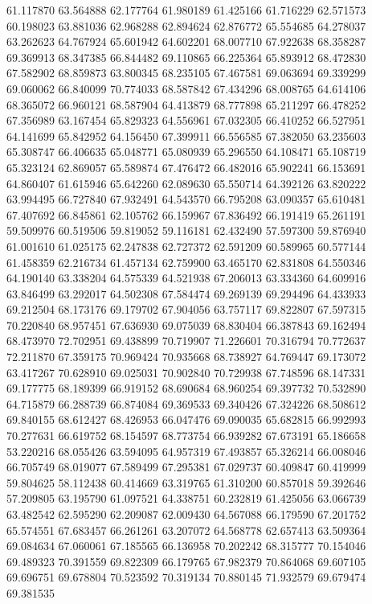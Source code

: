 61.117870
63.564888
62.177764
61.980189
61.425166
61.716229
62.571573
60.198023
63.881036
62.968288
62.894624
62.876772
65.554685
64.278037
63.262623
64.767924
65.601942
64.602201
68.007710
67.922638
68.358287
69.369913
68.347385
66.844482
69.110865
66.225364
65.893912
68.472830
67.582902
68.859873
63.800345
68.235105
67.467581
69.063694
69.339299
69.060062
66.840099
70.774033
68.587842
67.434296
68.008765
64.614106
68.365072
66.960121
68.587904
64.413879
68.777898
65.211297
66.478252
67.356989
63.167454
65.829323
64.556961
67.032305
66.410252
66.527951
64.141699
65.842952
64.156450
67.399911
66.556585
67.382050
63.235603
65.308747
66.406635
65.048771
65.080939
65.296550
64.108471
65.108719
65.323124
62.869057
65.589874
67.476472
66.482016
65.902241
66.153691
64.860407
61.615946
65.642260
62.089630
65.550714
64.392126
63.820222
63.994495
66.727840
67.932491
64.543570
66.795208
63.090357
65.610481
67.407692
66.845861
62.105762
66.159967
67.836492
66.191419
65.261191
59.509976
60.519506
59.819052
59.116181
62.432490
57.597300
59.876940
61.001610
61.025175
62.247838
62.727372
62.591209
60.589965
60.577144
61.458359
62.216734
61.457134
62.759900
63.465170
62.831808
64.550346
64.190140
63.338204
64.575339
64.521938
67.206013
63.334360
64.609916
63.846499
63.292017
64.502308
67.584474
69.269139
69.294496
64.433933
69.212504
68.173176
69.179702
67.904056
63.757117
69.822807
67.597315
70.220840
68.957451
67.636930
69.075039
68.830404
66.387843
69.162494
68.473970
72.702951
69.438899
70.719907
71.226601
70.316794
70.772637
72.211870
67.359175
70.969424
70.935668
68.738927
64.769447
69.173072
63.417267
70.628910
69.025031
70.902840
70.729938
67.748596
68.147331
69.177775
68.189399
66.919152
68.690684
68.960254
69.397732
70.532890
64.715879
66.288739
66.874084
69.369533
69.340426
67.324226
68.508612
69.840155
68.612427
68.426953
66.047476
69.090035
65.682815
66.992993
70.277631
66.619752
68.154597
68.773754
66.939282
67.673191
65.186658
53.220216
68.055426
63.594095
64.957319
67.493857
65.326214
66.008046
66.705749
68.019077
67.589499
67.295381
67.029737
60.409847
60.419999
59.804625
58.112438
60.414669
63.319765
61.310200
60.857018
59.392646
57.209805
63.195790
61.097521
64.338751
60.232819
61.425056
63.066739
63.482542
62.595290
62.209087
62.009430
64.567088
66.179590
67.201752
65.574551
67.683457
66.261261
63.207072
64.568778
62.657413
63.509364
69.084634
67.060061
67.185565
66.136958
70.202242
68.315777
70.154046
69.489323
70.391559
69.822309
66.179765
67.982379
70.864068
69.607105
69.696751
69.678804
70.523592
70.319134
70.880145
71.932579
69.679474
69.381535
